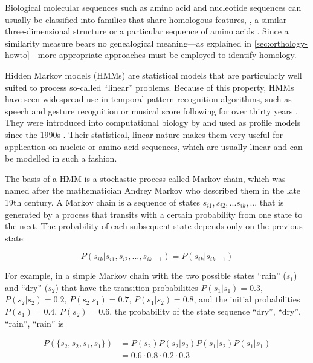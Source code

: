 \label{sec:hmms}
Biological molecular sequences such as amino acid and nucleotide sequences can
usually be classified into families that share homologous features, \eg, a
similar three-dimensional structure or a particular sequence of amino acids
\citep{henikoff1997}. Since a similarity measure bears no genealogical
meaning---as explained in \autoref{sec:orthology-howto}---more appropriate
approaches must be employed to identify homology.

Hidden Markov models (HMMs) are statistical models that are particularly well
suited to process so-called ``linear'' problems. Because of this property, HMMs
have seen widespread use in temporal pattern recognition algorithms, such as
speech and gesture recognition or musical score following for over thirty years
\citep{rabiner1989}. They were introduced into computational biology by
\citet{churchill1989} and used as profile models since the 1990s
\citep{krogh1994}. Their statistical, linear nature makes them very useful for
application on nucleic or amino acid sequences, which are usually linear and can
be modelled in such a fashion. 

The basis of a HMM is a stochastic process called Markov chain, which was named
after the mathematician Andrey Markov who described them in the late 19th
century. A Markov chain is a sequence of states $s_{i1}, s_{i2}, ...  s_{ik},
...$ that is generated by a process that transits with a certain probability
from one state to the next. The probability of each subsequent state depends
only on the previous state:

\begin{equation}
P(s_{ik} | s_{i1}, s_{i2}, ..., s_{ik-1}) = P(s_{ik} | s_{ik-1})
\label{eqn:markov-chain}
\end{equation}

For example, in a simple Markov chain with the two possible states ``rain''
($s_1$) and ``dry'' ($s_2$) that have the transition probabilities $P(s_1|s_1) =
0.3$, $P(s_2|s_2) = 0.2$, $P(s_2|s_1) = 0.7$, $P(s_1|s_2) = 0.8$, and the
initial probabilities $P(s_1) = 0.4$, $P(s_2) = 0.6$, the probability of the
state sequence ``dry'', ``dry'', ``rain'', ``rain'' is

\begin{equation}
	\begin{split}
		P(\{s_2, s_2, s_1, s_1\}) &= P(s_2) P(s_2|s_2) P(s_1|s_2) P(s_1|s_1) \\
		&= 0.6 \cdot 0.8 \cdot 0.2 \cdot 0.3 
	\end{split}
\label{eqn:markov-chain-weather}
\end{equation}

